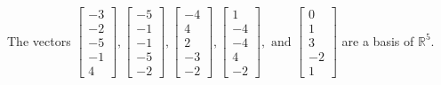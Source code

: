 \begin{exercise}
\begin{exerciseStatement}
  \end{exerciseStatement}
  \begin{exerciseAnswer}
   The vectors \(\left[\begin{array}{r}
-3 \\
-2 \\
-5 \\
-1 \\
4
\end{array}\right] , \left[\begin{array}{r}
-5 \\
-1 \\
-1 \\
-5 \\
-2
\end{array}\right] , \left[\begin{array}{r}
-4 \\
4 \\
2 \\
-3 \\
-2
\end{array}\right] , \left[\begin{array}{r}
1 \\
-4 \\
-4 \\
4 \\
-2
\end{array}\right] , \text{ and } \left[\begin{array}{r}
0 \\
1 \\
3 \\
-2 \\
1
\end{array}\right]\) 
  	 are  a basis of \(\mathbb{R}^5\).
  


  \end{exerciseAnswer}
\end{exercise}